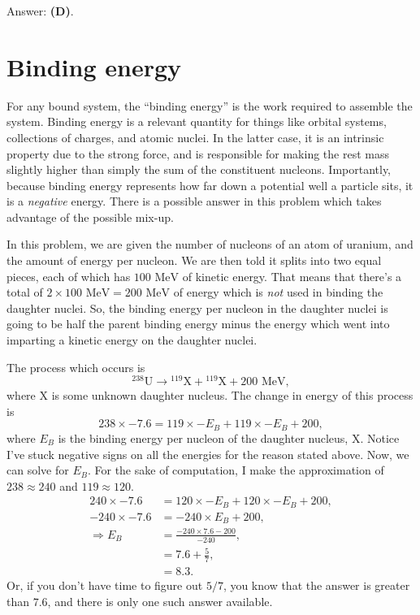\documentclass[11pt]{paper}
\newcommand{\answer}[1]{Answer: \textbf{(#1)}.}
\begin{document}
\answer{D}

\section{Binding energy}
For any bound system, the ``binding energy'' is the work required to assemble the system.  Binding energy is a relevant quantity for things like orbital systems, collections of charges, and atomic nuclei.  In the latter case, it is an intrinsic property due to the strong force, and is responsible for making the rest mass slightly higher than simply the sum of the constituent nucleons.  Importantly, because binding energy represents how far down a potential well a particle sits, it is a \emph{negative} energy.  There is a possible answer in this problem which takes advantage of the possible mix-up.

In this problem, we are given the number of nucleons of an atom of uranium, and the amount of energy per nucleon.  We are then told it splits into two equal pieces, each of which has $100\text{ MeV}$ of kinetic energy.  That means that there's a total of $2\times100\text{ MeV} = 200\text{ MeV}$ of energy which is \emph{not} used in binding the daughter nuclei.  So, the binding energy per nucleon in the daughter nuclei is going to be half the parent binding energy minus the energy which went into imparting a kinetic energy on the daughter nuclei.

The process which occurs is
\begin{equation}
{}^{238}\text{U} \rightarrow {}^{119}\text{X} + {}^{119}\text{X} + 200\text{ MeV},
\end{equation}
where $\text{X}$ is some unknown daughter nucleus.  The change in energy of this process is
\begin{equation}
238 \times -7.6 = 119 \times -E_B + 119 \times -E_B + 200,
\end{equation}
where $E_B$ is the binding energy per nucleon of the daughter nucleus, X.  Notice I've stuck negative signs on all the energies for the reason stated above.  Now, we can solve for $E_B$.  For the sake of computation, I make the approximation of $238 \approx 240$ and $119\approx 120$.
\begin{align}
240 \times -7.6 &= 120 \times -E_B + 120 \times -E_B + 200,\\
-240 \times -7.6 &= -240 \times E_B + 200,\\
\Rightarrow E_B &= \frac{-240\times7.6-200}{-240},\\
&=7.6+\frac{5}{7},\\
&=8.3.
\end{align}
Or, if you don't have time to figure out $5/7$, you know that the answer is greater than $7.6$, and there is only one such answer available.\\
\end{document}
